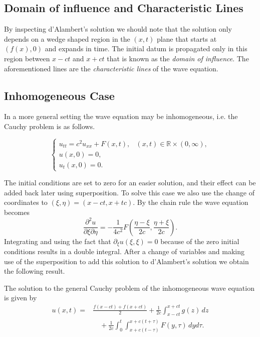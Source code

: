 \subsection{Domain of influence and Characteristic Lines}

By inspecting d'Alambert's solution we should note that the solution only
depends on a wedge shaped region in the $(x,t)$ plane that starts at
$(f(x),0)$ and expands in time. The initial datum is propagated only in this
region between $x-ct$ and $x+ct$ that is known as the \emph{domain of
influence}. The aforementioned lines are the \emph{characteristic lines} of
the wave equation.

\subsection{Inhomogeneous Case}

In a more general setting the wave equation may be inhomogeneous, i.e. the
Cauchy problem is as follows.

\begin{defn}
  \label{def:wave:inhom-cauchy}
  \[
    \begin{cases}
      u_{tt} =  c^2 u_{xx} + F(x,t), 
        & (x, t) \in\mathbb{R} \times (0, \infty), \\
      u(x,0) = 0, \\
      u_t(x,0) = 0.
    \end{cases}
  \]
\end{defn}

The initial conditions are set to zero for an easier solution, and their
effect can be added back later using superposition. To solve this case we also
use the change of coordinates to $(\xi,\eta) = (x-ct, x+tc)$. By the chain
rule the wave equation becomes
\[
  \frac{\partial^2 u}{\partial \xi \partial \eta}
  = -\frac{1}{4c^2} F\left(\frac{\eta - \xi}{2c}, \frac{\eta + \xi}{2c}\right).
\]
Integrating and using the fact that $\partial_\xi u(\xi,\xi) = 0$ because of
the zero initial conditions results in a double integral. After a change of
variables and making use of the superposition to add this solution to
d'Alambert's solution we obtain the following result.

\begin{thm}
  The solution to the general Cauchy problem of the inhomogeneous wave
  equation is given by
  \begin{align*}
    u(x,t) = &\frac{f(x-ct) + f(x+ct)}{2} 
      + \frac{1}{2c} \int_{x-ct}^{x+ct} g(z) \,dz \\
      &\quad + \frac{1}{2c}
        \int_0^t \int_{x+c(t-\tau)}^{x+c(t+\tau)} F(y, \tau) \, dy d\tau.
  \end{align*}
\end{thm}

